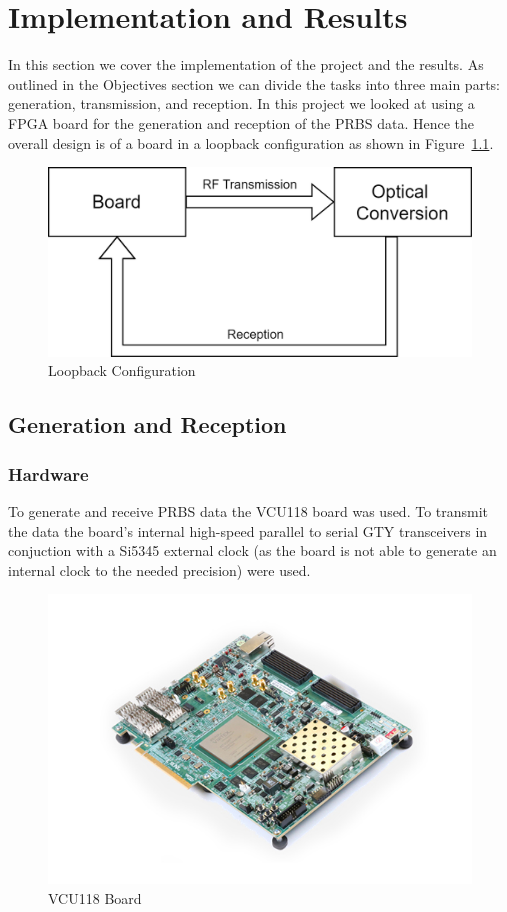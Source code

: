 \chapter{Implementation and Results}
In this section we cover the implementation of the project and the results.
As outlined in the Objectives section we can divide the tasks into three main
parts: generation, transmission, and reception. 
In this project we looked at using a FPGA board for the generation and
reception of the PRBS data.  Hence the overall design is of a board in a
loopback configuration as shown in Figure~\ref{fig:loopback}.

\begin{figure}[ht]
    \centering
    \includegraphics[width=0.6\linewidth]{img/loopback.png}
    \caption{Loopback Configuration}%
    \label{fig:loopback}
\end{figure}

\section{Generation and Reception}%
\label{sec:generation_and_reception}


\subsection{Hardware}%
\label{sub:hardware}
To generate and receive PRBS data the VCU118 board was used. To transmit the
data the board's internal high-speed parallel to serial GTY transceivers in
conjuction with a Si5345 external clock (as the board is not able to generate
an internal clock to the needed precision) were used.

\begin{figure}[ht]
    \centering
    \includegraphics[width=0.5\linewidth]{img/board.jpg}
    \caption{VCU118 Board}%
    \label{fig:board}
\end{figure}

